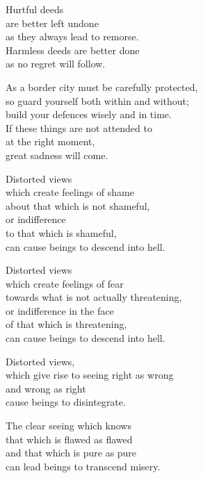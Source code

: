Hurtful deeds\\
are better left undone\\
as they always lead to remorse.\\
Harmless deeds are better done\\
as no regret will follow.


As a border city must be carefully protected,\\
so guard yourself both within and without;\\
build your defences wisely and in time.\\
If these things are not attended to\\
at the right moment,\\
great sadness will come.


Distorted views\\
which create feelings of shame\\
about that which is not shameful,\\
or indifference\\
to that which is shameful,\\
can cause beings to descend into hell.


Distorted views\\
which create feelings of fear\\
towards what is not actually threatening,\\
or indifference in the face\\
of that which is threatening,\\
can cause beings to descend into hell.


Distorted views,\\
which give rise to seeing right as wrong\\
and wrong as right\\
cause beings to disintegrate.


The clear seeing which knows\\
that which is flawed as flawed\\
and that which is pure as pure\\
can lead beings to transcend misery.

